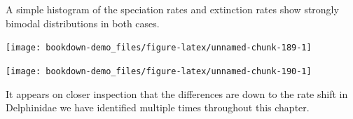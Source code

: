 \documentclass[
]{book}
\newenvironment{Shaded}{\begin{snugshade}}{\end{snugshade}}
\newcommand{\DataTypeTok}[1]{\textcolor[rgb]{0.13,0.29,0.53}{#1}}
\newcommand{\KeywordTok}[1]{\textcolor[rgb]{0.13,0.29,0.53}{\textbf{#1}}}
\newcommand{\NormalTok}[1]{#1}
\newcommand{\OperatorTok}[1]{\textcolor[rgb]{0.81,0.36,0.00}{\textbf{#1}}}
\newcommand{\StringTok}[1]{\textcolor[rgb]{0.31,0.60,0.02}{#1}}
\begin{document}
A simple histogram of the speciation rates and extinction rates show strongly bimodal distributions in both cases.

\begin{Shaded}
\end{Shaded}

\begin{center}\texttt{[image: bookdown-demo\_files/figure-latex/unnamed-chunk-189-1]} \end{center}

\begin{Shaded}
\end{Shaded}

\begin{center}\texttt{[image: bookdown-demo\_files/figure-latex/unnamed-chunk-190-1]} \end{center}

It appears on closer inspection that the differences are down to the rate shift in Delphinidae we have identified multiple times throughout this chapter.
\end{document}
